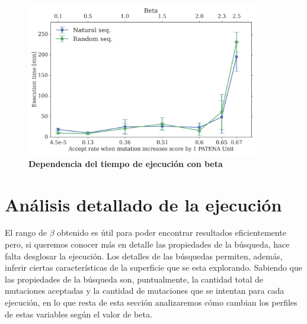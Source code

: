 \begin{figure}[htbp]
\centering
\includegraphics[width=0.9\textwidth]{img/resultados/beta-vs-time-length50-300dpi.png}
\caption{\textbf{Dependencia del tiempo de ejecución con beta}}
\label{fig:beta-vs-time}
\end{figure}















\section{Análisis detallado de la ejecución}
% 
% 



El rango de $\beta$ obtenido es útil para poder encontrar resultados eficientemente pero, si queremos conocer más en detalle las propiedades de la búsqueda,
hace falta desglosar la ejecución.
Los detalles de las búsquedas permiten, además, inferir ciertas características de la superficie que se esta explorando.
Sabiendo que las propiedades de la búsqueda son, puntualmente, 
la cantidad total de mutaciones aceptadas y la cantidad de mutaciones que se intentan para cada ejecución, 
en lo que resta de esta sección analizaremos cómo cambian los perfiles de estas variables según el valor de beta. %
 
